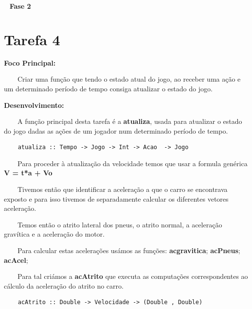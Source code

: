 \documentclass[a4paper]{report} %
\begin{document}
           \vspace{10mm}
           
          \ \textbf{ { \LARGE Fase 2} }
          \vspace{5mm} 
          
          \section{Tarefa 4}
         
           \vspace{5mm} 
           \par \textbf{ Foco Principal:} 
           \par \ \ \ \ Criar uma função que tendo o estado atual do jogo, ao receber uma ação e um determinado período de tempo consiga atualizar o estado do jogo. 
           \vspace{5mm}
           \par \textbf{ Desenvolvimento:} 
           \par \ \ \ \ A função principal desta tarefa é a \textbf{atualiza}, usada para atualizar o estado do jogo dadas as ações de um jogador num determinado período de tempo.
                                \begin{verbatim}
    atualiza :: Tempo -> Jogo -> Int -> Acao  -> Jogo                                
                                \end{verbatim}
           \par \ \ \ \ Para proceder à atualização da velocidade temos que usar a formula genérica \textbf{V = t*a + Vo}
           \par \ \ \ \ Tivemos então que identificar a aceleração a que o carro se encontrava exposto e para isso tivemos de separadamente calcular os diferentes vetores aceleração.
           \par \ \ \ \ Temos então o atrito lateral dos pneus, o atrito normal, a aceleração gravítica e a aceleração do motor.
           \par \ \ \ \ Para calcular estas acelerações usámos as funções: \textbf{acgravitica}; \textbf{acPneus}; \textbf{acAcel}; 
           \par \ \ \ \ Para tal criámos a \textbf{acAtrito} que executa as computações correspondentes ao cálculo da aceleração do atrito no carro.
                            \begin{verbatim}
    acAtrito :: Double -> Velocidade -> (Double , Double)                            
                            \end{verbatim}
\end{document}
